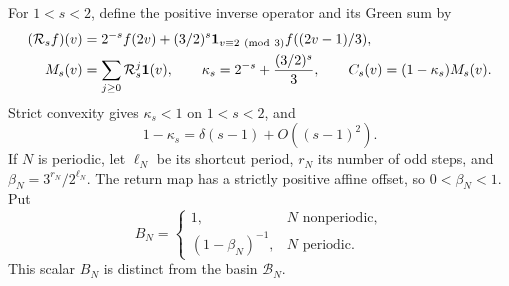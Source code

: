 \documentclass[11pt,a4paper]{article}
\begin{document}
For \(1<s<2\), define the positive inverse operator and its
Green sum by
\begin{align}
 (\mathcal R_s f)(v)
   &=2^{-s}f(2v)
      +(3/2)^s\mathbf1_{v\equiv2\ ({\rm mod}\ 3)}
                                f((2v-1)/3),\label{eq:ct-Rs}\\
 M_s(v)&=\sum_{j\ge0}\mathcal R_s^j\mathbf1(v),\qquad
 \kappa_s=2^{-s}+\frac{(3/2)^s}{3},\qquad
 C_s(v)=(1-\kappa_s)M_s(v).\label{eq:ct-Green-def}
\end{align}
Strict convexity gives \(\kappa_s<1\) on \(1<s<2\), and
\begin{equation}\label{eq:ct-kappa-expansion}
 1-\kappa_s=\delta(s-1)+O((s-1)^2).
\end{equation}
If \(N\) is periodic, let \(\ell_N\) be its shortcut period,
\(r_N\) its number of odd steps, and
\(\beta_N=3^{r_N}/2^{\ell_N}\). The return map has a strictly
positive affine offset, so \(0<\beta_N<1\). Put
\[
 B_N=
 \begin{cases}
 1,&N\text{ nonperiodic},\\
 (1-\beta_N)^{-1},&N\text{ periodic}.
 \end{cases}
\]
This scalar \(B_N\) is distinct from the basin \(\mathcal B_N\).
\end{document}
